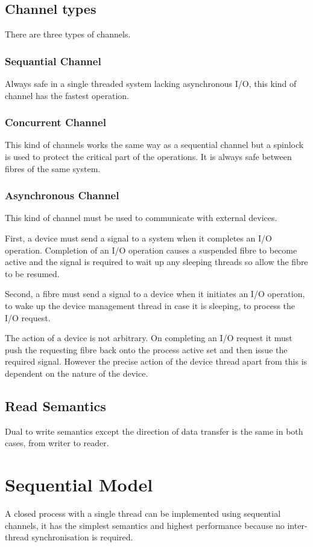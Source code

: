 \documentclass[oneside]{book}
\begin{document}
\subsection{Channel types}
There are three types of channels.

\subsubsection{Sequantial Channel}
Always safe in a single threaded system lacking asynchronous I/O,
this kind of channel has the fastest operation.

\subsubsection{Concurrent Channel}
This kind of channels works the same way as a sequential
channel but a spinlock is used to protect the critical part
of the operations. It is always safe between fibres of the same system.

\subsubsection{Asynchronous Channel}
This kind of channel must be used to communicate with external devices.

First, a device must send a signal to a system when it completes an I/O
operation. Completion of an I/O operation causes a suspended fibre to
become active and the signal is required to wait up any sleeping threads
so allow the fibre to be resumed.

Second, a fibre must send a signal to a device when it initiates
an I/O operation, to wake up the device management thread in
case it is sleeping, to process the I/O request.

The action of a device is not arbitrary. On completing an I/O request
it must push the requesting fibre back onto the process active set
and then issue the required signal. However the precise action
of the device thread apart from this is dependent on the nature
of the device.


\subsection{Read Semantics}
Dual to write semantics except the direction of data transfer is the same
in both cases, from writer to reader.

\section{Sequential Model}
A closed process with a single thread can be implemented using sequential channels,
it has the simplest semantics and highest performance because no inter-thread synchronisation
is required.
\end{document}
